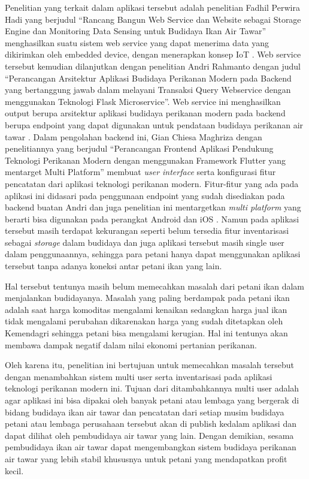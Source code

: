 Penelitian yang terkait dalam aplikasi tersebut adalah penelitian Fadhil Perwira Hadi yang berjudul “Rancang Bangun Web Service dan Website sebagai Storage Engine dan Monitoring Data Sensing untuk Budidaya Ikan Air Tawar” menghasilkan suatu sistem web service yang dapat menerima data yang dikirimkan oleh embedded device, dengan menerapkan konsep IoT \citep*{fadhil2022}. Web service tersebut kemudian dilanjutkan dengan penelitian Andri Rahmanto dengan judul “Perancangan Arsitektur Aplikasi Budidaya Perikanan Modern pada Backend yang bertanggung jawab dalam melayani Transaksi Query Webservice dengan menggunakan Teknologi Flask Microservice”. Web service ini menghasilkan output berupa arsitektur aplikasi budidaya perikanan modern pada backend berupa endpoint yang dapat digunakan untuk pendataan budidaya perikanan air tawar \citep*{andri2022}. Dalam pengolahan backend ini, Gian Chiesa Maghriza dengan penelitiannya yang berjudul “Perancangan Frontend Aplikasi Pendukung Teknologi Perikanan Modern dengan menggunakan Framework Flutter yang mentarget Multi Platform” membuat \textit{user interface} serta konfigurasi fitur pencatatan dari aplikasi teknologi perikanan modern. Fitur-fitur yang ada pada aplikasi ini didasari pada penggunaan endpoint yang sudah disediakan pada backend buatan Andri dan juga penelitian ini mentargetkan \textit{multi platform} yang berarti bisa digunakan pada perangkat Android dan iOS \citep*{gian2022}. Namun pada aplikasi tersebut masih terdapat kekurangan seperti belum tersedia fitur inventarisasi sebagai \textit{storage} dalam budidaya dan juga aplikasi tersebut masih single user dalam penggunaannya, sehingga para petani hanya dapat menggunakan aplikasi tersebut tanpa adanya koneksi antar petani ikan yang lain.

Hal tersebut tentunya masih belum memecahkan masalah dari petani ikan dalam menjalankan budidayanya. Masalah yang paling berdampak pada petani ikan adalah saat harga komoditas mengalami kenaikan sedangkan harga jual ikan tidak mengalami perubahan dikarenakan harga yang sudah ditetapkan oleh Kemendagri sehingga petani bisa mengalami kerugian. Hal ini tentunya akan membawa dampak negatif dalam nilai ekonomi pertanian perikanan.

Oleh karena itu, penelitian ini bertujuan untuk memecahkan masalah tersebut dengan menambahkan sistem multi user serta inventarisasi pada aplikasi teknologi perikanan modern ini. Tujuan dari ditambahkannya multi user adalah agar aplikasi ini bisa dipakai oleh banyak petani atau lembaga yang bergerak di bidang budidaya ikan air tawar dan pencatatan dari setiap musim budidaya petani atau lembaga perusahaan tersebut akan di publish kedalam aplikasi dan dapat dilihat oleh pembudidaya air tawar yang lain. Dengan demikian, sesama pembudidaya ikan air tawar dapat mengembangkan sistem budidaya perikanan air tawar yang lebih stabil khususnya untuk petani yang mendapatkan profit kecil. 

